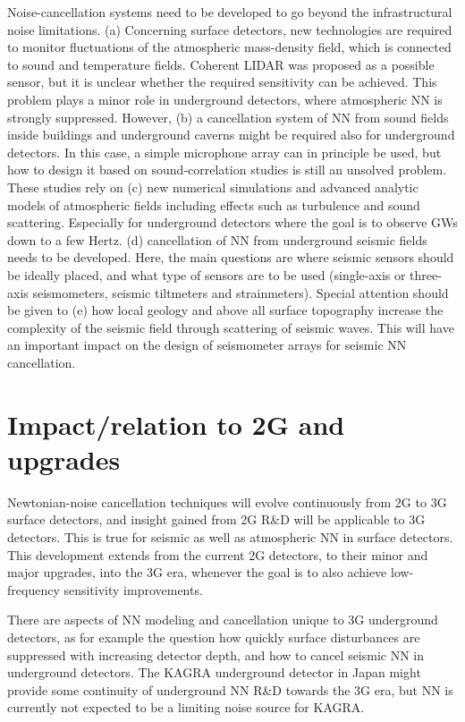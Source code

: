 Noise-cancellation systems need to be developed 
to go beyond the infrastructural noise limitations. (a) Concerning surface detectors, new technologies are required to monitor fluctuations of the atmospheric mass-density field, which is connected to sound and temperature fields. Coherent LIDAR was proposed as a possible sensor, but it is unclear whether the required sensitivity can be achieved. This problem plays a minor role in underground detectors, where atmospheric NN is strongly suppressed. However, (b) a cancellation system of NN from sound fields inside buildings and underground caverns might be required also for underground detectors. In this case, a simple microphone array can in principle be used, but how to design it based on sound-correlation studies is still an unsolved problem. These studies rely on (c) new numerical simulations and advanced analytic models of atmospheric fields including effects such as turbulence and sound scattering. Especially for underground detectors where the goal is to observe GWs down to a few Hertz. (d) cancellation of NN from underground seismic fields needs to be developed. Here, the main questions are where seismic sensors should be ideally placed, and what type of sensors are to be used (single-axis or three-axis seismometers, seismic tiltmeters and strainmeters). Special attention should be given to (e) how local geology and above all surface topography increase the complexity of the seismic field through scattering of seismic waves. This will have an important impact on 
the design of seismometer arrays for seismic NN cancellation.

\section{Impact/relation to 2G and upgrades}
Newtonian-noise cancellation techniques will evolve continuously from 2G to 3G surface detectors, and insight gained from 2G R\&D will be applicable to 3G detectors. This is true for seismic as well as atmospheric NN in surface detectors. This development extends from the current 2G detectors, to their minor and major upgrades, into the 3G era, whenever the goal is to also achieve low-frequency sensitivity improvements. 

There are aspects of NN modeling and cancellation unique to 3G underground detectors, as for example the question how quickly surface disturbances are suppressed with increasing detector depth, and how to cancel seismic NN in underground detectors. The KAGRA underground detector in Japan might 
provide some continuity of underground NN R\&D towards the 3G era, but NN is currently not expected to be a limiting noise source for KAGRA.

